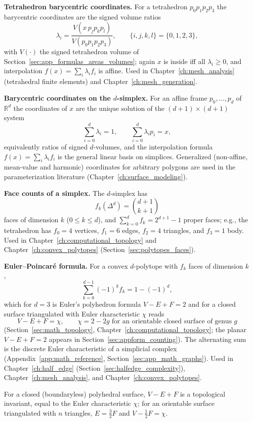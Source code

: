 \medskip\noindent\textbf{Tetrahedron barycentric coordinates.}
For a tetrahedron $p_0 p_1 p_2 p_3$ the barycentric coordinates are the
signed volume ratios
\[
  \lambda_i = \frac{V(x\, p_j p_k p_l)}{V(p_0 p_1 p_2 p_3)},
  \qquad \{i, j, k, l\} = \{0, 1, 2, 3\},
\]
with $V(\cdot)$ the signed tetrahedron volume of
Section~\ref{sec:app_formulas_areas_volumes}; again $x$ is inside iff all
$\lambda_i \ge 0$, and interpolation $f(x) = \sum_i \lambda_i f_i$ is
affine. Used in Chapter~\ref{ch:mesh_analysis} (tetrahedral finite
elements) and Chapter~\ref{ch:mesh_generation}.

\medskip\noindent\textbf{Barycentric coordinates on the $d$-simplex.}
For an affine frame $p_0, \dots, p_d$ of $\mathbb{R}^d$ the coordinates of
$x$ are the unique solution of the $(d+1)\times(d+1)$ system
\[
  \sum_{i=0}^{d} \lambda_i = 1,
  \qquad
  \sum_{i=0}^{d} \lambda_i p_i = x,
\]
equivalently ratios of signed $d$-volumes, and the interpolation formula
$f(x) = \sum_i \lambda_i f_i$ is the general linear basis on simplices.
Generalized (non-affine, mean-value and harmonic) coordinates for arbitrary
polygons are used in the parameterization literature
(Chapter~\ref{ch:surface_modeling}).

\medskip\noindent\textbf{Face counts of a simplex.}
The $d$-simplex has
\[
  f_k(\Delta^d) = \binom{d+1}{k+1}
\]
faces of dimension $k$ ($0 \le k \le d$), and
$\sum_{k=0}^{d} f_k = 2^{d+1} - 1$ proper faces; e.g., the tetrahedron has
$f_0 = 4$ vertices, $f_1 = 6$ edges, $f_2 = 4$ triangles, and $f_3 = 1$
body. Used in Chapter~\ref{ch:computational_topology} and
Chapter~\ref{ch:convex_polytopes} (Section~\ref{sec:polytopes_faces}).

\medskip\noindent\textbf{Euler--Poincar\'e formula.}
For a convex $d$-polytope with $f_k$ faces of dimension $k$,
\[
  \sum_{k=0}^{d-1} (-1)^k f_k = 1 - (-1)^d,
\]
which for $d = 3$ is Euler's polyhedron formula $V - E + F = 2$ and for a
closed surface triangulated with Euler characteristic $\chi$ reads
\[
  V - E + F = \chi,
  \qquad
  \chi = 2 - 2g \text{ for an orientable closed surface of genus } g
\]
(Section~\ref{sec:math_topology}, Chapter~\ref{ch:computational_topology};
the planar $V - E + F = 2$ appears in Section~\ref{sec:appform_counting}).
The alternating sum is the discrete Euler characteristic of a simplicial
complex (Appendix~\ref{app:math_reference}, Section~\ref{sec:app_math_graphs}).
Used in Chapter~\ref{ch:half_edge} (Section~\ref{sec:halfedge_complexity}),
Chapter~\ref{ch:mesh_analysis}, and Chapter~\ref{ch:convex_polytopes}.

\begin{theorem}\label{thm:appform_euler_poincare}
  For a closed (boundaryless) polyhedral surface, $V - E + F$ is a
  topological invariant, equal to the Euler characteristic $\chi$; for an
  orientable surface triangulated with $n$ triangles,
  $E = \frac{3}{2}F$ and $V - \frac{1}{2}F = \chi$.
\end{theorem}


